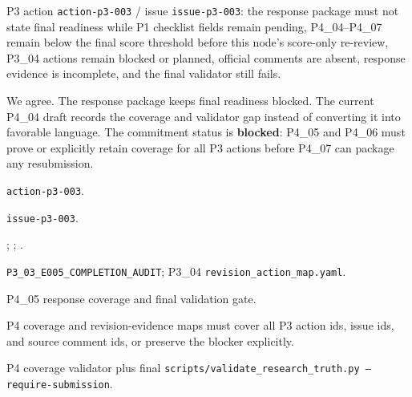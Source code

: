 \begin{revcomment}
P3 action \texttt{action-p3-003} / issue \texttt{issue-p3-003}: the response package must not state final readiness while P1 checklist fields remain pending, P4\_04--P4\_07 remain below the final score threshold before this node's score-only re-review, P3\_04 actions remain blocked or planned, official comments are absent, response evidence is incomplete, and the final validator still fails.
\end{revcomment}
\begin{revresponse}
We agree. The response package keeps final readiness blocked. The current P4\_04 draft records the coverage and validator gap instead of converting it into favorable language. The commitment status is \textbf{blocked}: P4\_05 and P4\_06 must prove or explicitly retain coverage for all P3 actions before P4\_07 can package any resubmission.

\begin{description}[leftmargin=3.2cm,style=nextline]
    \item[Action id] \texttt{action-p3-003}.
    \item[Issue id] \texttt{issue-p3-003}.
    \item[Source comments] \texttt{}; \texttt{}; \texttt{}.
    \item[Evidence refs] \texttt{P3\_03\_E005\_COMPLETION\_AUDIT}; P3\_04 \texttt{revision\_action\_map.yaml}.
    \item[Target location] P4\_05 response coverage and final validation gate.
    \item[Required change] P4 coverage and revision-evidence maps must cover all P3 action ids, issue ids, and source comment ids, or preserve the blocker explicitly.
    \item[Validation gate] P4 coverage validator plus final \texttt{scripts/validate\_research\_truth.py --require-submission}.
\end{description}
\end{revresponse}
